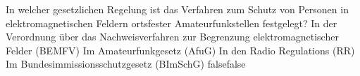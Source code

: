     {In welcher gesetzlichen Regelung ist das Verfahren zum Schutz von Personen in elektromagnetischen Feldern ortsfester Amateurfunkstellen festgelegt?}
    {In der Verordnung über das Nachweisverfahren zur Begrenzung elektromagnetischer Felder (BEMFV)}
    {Im Amateurfunkgesetz (AfuG)}
    {In den Radio Regulations (RR)}
    {Im Bundesimmissionsschutzgesetz (BImSchG)}
    {false}{false}